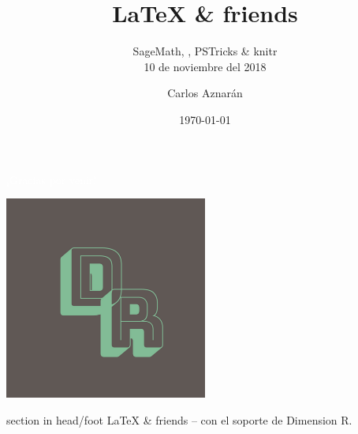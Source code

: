 \documentclass[spanish,9pt]{beamer}
\title[\LaTeX{} \& friends]{\LaTeX{} \& friends}
\subtitle{SageMath, \ararawhite, PSTricks \& knitr\\[\baselineskip]
10 de noviembre del 2018}
\author[Dimension R]{Carlos Aznarán}
\institute[Universidad Nacional de Ingeniería]{Matemáticas\\
Facultad de Ciencias\\
Universidad Nacional de Ingeniería}
\date[\today]{\today}
\begin{document}
\begin{frame}
\titlepage
\end{frame}

\begin{frame}
\frametitle{\contentsname}
\tableofcontents
\end{frame}



%
%
%
%

\begin{frame}[plain,b]
\centering
\huge \textcolor{white}{¡Gracias por venir!}
\normalsize
\begin{center}
	\includegraphics[width=0.5\textwidth]{DimensionR}\\
\end{center}
\vspace*{\fill}

\begin{beamercolorbox}[wd=\paperwidth]{section in head/foot}
\centering\large
\LaTeX{} \& friends -- con el soporte de Dimension R.
\vskip10pt
\end{beamercolorbox}
\end{frame}
\end{document}
